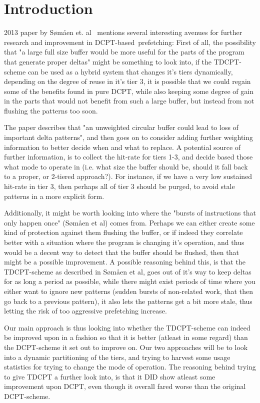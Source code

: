 \section{Introduction}

 2013 paper by Sømåen et. al~\cite{Somaen} mentions several
interesting avenues for further research and improvement in DCPT-based~\footnotemark[1]
prefetching: First of all, the possibility that "a large full size buffer would be
more useful for the parts of the program that generate proper deltas" might be
something to look into, if the TDCPT-scheme can be used as a hybrid system that 
changes it's tiers dynamically, depending on the degree of reuse in it's tier 3,
it is possible that we could regain some of the benefits found in pure DCPT, while
also keeping some degree of gain in the parts that would not benefit from such a
large buffer, but instead from not flushing the patterns too soon.


The paper describes that "an unweighted circular buffer could lead to loss of important
delta patterns", and then goes on to consider adding further
weighting information to better decide when and what to replace. A potential source
of further information, is to collect the hit-rate for tiers 1-3, and decide based 
those what mode to operate in (i.e. what size the buffer should be, should it fall 
back to a proper, or 2-tiered approach?). For instance, if we have a very low
sustained hit-rate in tier 3, then perhaps all of tier 3 should be purged, to avoid
stale patterns in a more explicit form.

Additionally, it might be worth looking into where the "bursts of instructions that
only happen once" (Sømåen et al) comes from. Perhaps we can either create some kind
of protection against them flushing the buffer, or if indeed they correlate better
with a situation where the program is changing it's operation, and thus would be
a decent way to detect that the buffer should be flushed, then that might be a
possible improvement. A possible reasoning behind this, is that the TDCPT-scheme as
described in Sømåen et al, goes out of it's way to keep deltas for as long a period
as possible, while there might exist periods of time where you either want to
ignore new patterns (sudden bursts of non-related work, that then go back to a
previous pattern), it also lets the patterns get a bit more stale, thus letting the
risk of too aggressive prefetching increase.

Our main approach is thus looking into whether the TDCPT-scheme can indeed be
improved upon in a fashion so that it is better (atleast in some regard) than the
DCPT-scheme it set out to improve on. Our two approaches will be to look into a
dynamic partitioning of the tiers, and trying to harvest some usage statistics for
trying to change the mode of operation. The reasoning behind trying to give TDCPT
a further look into, is that it DID show atleast some improvement upon DCPT, even
though it overall fared worse than the original DCPT-scheme.
